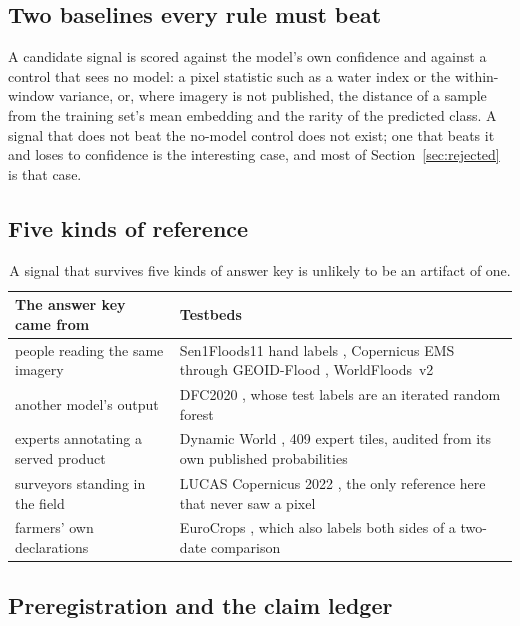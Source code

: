 \documentclass[11pt,a4paper]{article}
\begin{document}
\subsection{Two baselines every rule must beat}

A candidate signal is scored against the model's own confidence and against a
control that sees no model: a pixel statistic such as a water index or the
within-window variance, or, where imagery is not published, the distance of a
sample from the training set's mean embedding and the rarity of the predicted
class. A signal that does not beat the no-model control does not exist; one that
beats it and loses to confidence is the interesting case, and most of
Section~\ref{sec:rejected} is that case.

\subsection{Five kinds of reference}

\begin{table}[h]
\centering\small
\begin{tabularx}{\linewidth}{lX}
\toprule
The answer key came from & Testbeds \\
\midrule
people reading the same imagery & Sen1Floods11 hand labels \citep{bonafilia2020}, Copernicus EMS through GEOID-Flood \citep{chiriaco2026}, WorldFloods~v2 \\
another model's output & DFC2020 \citep{yokoya2020}, whose test labels are an iterated random forest \\
experts annotating a served product & Dynamic World \citep{brown2022}, 409 expert tiles, audited from its own published probabilities \\
surveyors standing in the field & LUCAS Copernicus 2022 \citep{dandrimont2021}, the only reference here that never saw a pixel \\
farmers' own declarations & EuroCrops \citep{schneider2023}, which also labels both sides of a two-date comparison \\
\bottomrule
\end{tabularx}
\caption{A signal that survives five kinds of answer key is unlikely to be an artifact of one.}
\end{table}

\subsection{Preregistration and the claim ledger}
\end{document}
